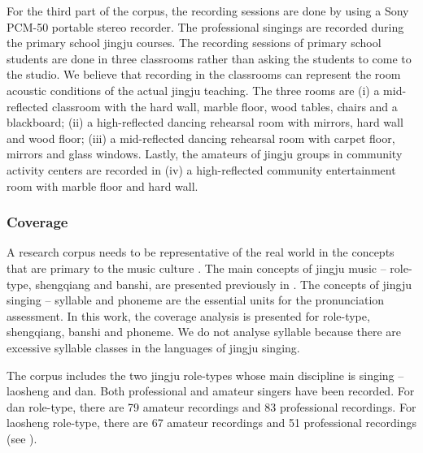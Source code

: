 For the third part of the corpus, the recording sessions are done by using a Sony PCM-50 portable stereo recorder. The professional singings are recorded during the primary school jingju courses. The recording sessions of primary school students are done in three classrooms rather than asking the students to come to the studio. We believe that recording in the classrooms can represent the room acoustic conditions of the actual jingju teaching. The three rooms are (i) a mid-reflected classroom with the hard wall, marble floor, wood tables, chairs and a blackboard; (ii) a high-reflected dancing rehearsal room with mirrors, hard wall and wood floor; (iii) a mid-reflected dancing rehearsal room with carpet floor, mirrors and glass windows. Lastly, the amateurs of jingju groups in community activity centers are recorded in (iv) a high-reflected community entertainment room with marble floor and hard wall.

\subsubsection{Coverage}

A research corpus needs to be representative of the real world in the concepts that are primary to the music culture \cite{Srinivasamurthy2016}. The main concepts of jingju music -- role-type, \gls{shengqiang} and \gls{banshi}, are presented previously in . The concepts of jingju singing -- syllable and phoneme are the essential units for the pronunciation assessment. In this work, the coverage analysis is presented for role-type, \gls{shengqiang}, \gls{banshi} and phoneme. We do not analyse syllable because there are excessive syllable classes in the languages of jingju singing.

The corpus includes the two jingju role-types whose main discipline is singing -- \gls{laosheng} and \gls{dan}. Both professional and amateur singers have been recorded. For \gls{dan} role-type, there are 79 amateur recordings and 83 professional recordings. For \gls{laosheng} role-type, there are 67 amateur recordings and 51 professional recordings (see ).

